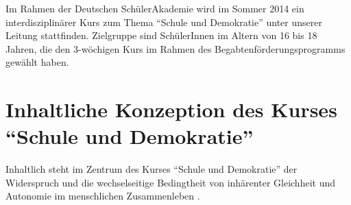 \documentclass[11pt,a4paper,oneside]{article}
\begin{document}



Im Rahmen der Deutschen SchülerAkademie wird im Sommer 2014 ein interdisziplinärer Kurs zum Thema ``Schule und Demokratie'' unter unserer Leitung stattfinden.
Zielgruppe sind SchülerInnen im Altern von 16 bis 18 Jahren, die den 3-wöchigen Kurs im Rahmen des Begabtenförderungsprogramms gewählt haben.

\section{Inhaltliche Konzeption des Kurses ``Schule und Demokratie''}

Inhaltlich steht im Zentrum des Kurses ``Schule und Demokratie'' der Widerspruch und die wechselseitige Bedingtheit von inhärenter Gleichheit und Autonomie im menschlichen Zusammenleben \cite{Habermas1999a}.
\end{document}
